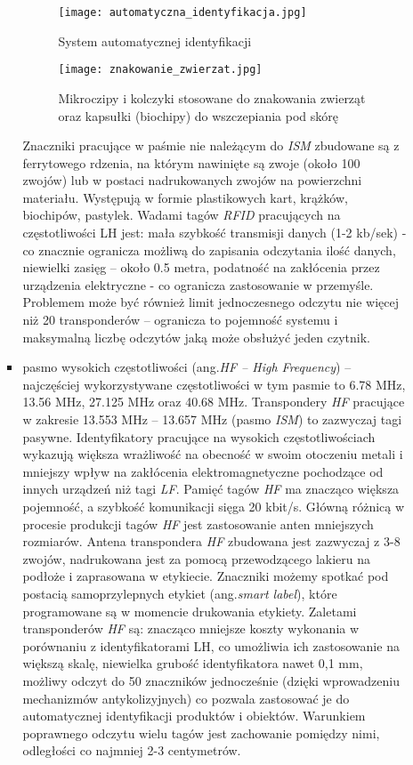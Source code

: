 \begin{itemize}
\begin{itemize}
\begin{itemize}
	\begin{figure}[h!]
	\centering
	    \texttt{[image: automatyczna\_identyfikacja.jpg]}
	    \caption{System automatycznej identyfikacji}
	\end{figure}
	
	\begin{figure}[h!]
	\centering
	    \texttt{[image: znakowanie\_zwierzat.jpg]}
	    \caption{Mikroczipy i kolczyki stosowane do znakowania zwierząt oraz kapsułki (biochipy) do wszczepiania pod skórę}
	\end{figure}
	
	Znaczniki pracujące w paśmie nie należącym do \emph{ISM} zbudowane są z ferrytowego rdzenia, na którym nawinięte są zwoje (około 100 zwojów) lub w postaci nadrukowanych zwojów na powierzchni materiału. Występują w formie plastikowych kart, krążków, biochipów, pastylek. Wadami tagów \emph{RFID} pracujących na częstotliwości LH jest: mała szybkość transmisji danych (1-2 kb/sek) - co znacznie ogranicza możliwą do zapisania odczytania ilość danych, niewielki zasięg – około 0.5 metra, podatność na zakłócenia przez urządzenia elektryczne  - co ogranicza zastosowanie w przemyśle. Problemem może być również limit jednoczesnego odczytu nie więcej niż 20 transponderów – ogranicza to pojemność systemu i maksymalną liczbę odczytów jaką może obsłużyć jeden czytnik. 

	\item pasmo wysokich częstotliwości (ang.\emph{HF – High Frequency}) – najczęściej wykorzystywane częstotliwości w tym pasmie to 6.78 MHz, 13.56 MHz, 27.125 MHz oraz 40.68 MHz. 
Transpondery \emph{HF} pracujące w zakresie 13.553 MHz – 13.657 MHz (pasmo \emph{ISM}) to zazwyczaj tagi pasywne. Identyfikatory pracujące na wysokich częstotliwościach wykazują większa wrażliwość na obecność w swoim otoczeniu metali i mniejszy wpływ na zakłócenia elektromagnetyczne pochodzące od  innych urządzeń niż tagi \emph{LF}. Pamięć tagów \emph{HF}  ma znacząco większa pojemność, a szybkość komunikacji sięga 20 kbit/s. Główną różnicą w procesie produkcji tagów \emph{HF} jest zastosowanie anten mniejszych rozmiarów. Antena transpondera \emph{HF} zbudowana jest zazwyczaj z 3-8 zwojów, nadrukowana jest za pomocą przewodzącego lakieru na podłoże i zaprasowana w etykiecie. Znaczniki możemy spotkać pod postacią samoprzylepnych etykiet (ang.\emph{smart label}), które programowane są w momencie drukowania etykiety. Zaletami transponderów \emph{HF} są: znacząco mniejsze koszty wykonania w porównaniu z identyfikatorami LH, co umożliwia ich zastosowanie na większą skalę, niewielka grubość identyfikatora nawet 0,1 mm, możliwy odczyt do 50 znaczników jednocześnie (dzięki wprowadzeniu mechanizmów antykolizyjnych) co pozwala zastosować je do automatycznej identyfikacji produktów i obiektów.  Warunkiem poprawnego odczytu wielu tagów jest zachowanie pomiędzy nimi, odległości co najmniej 2-3 centymetrów. 
	

\end{itemize}
\end{itemize}
\end{itemize}
